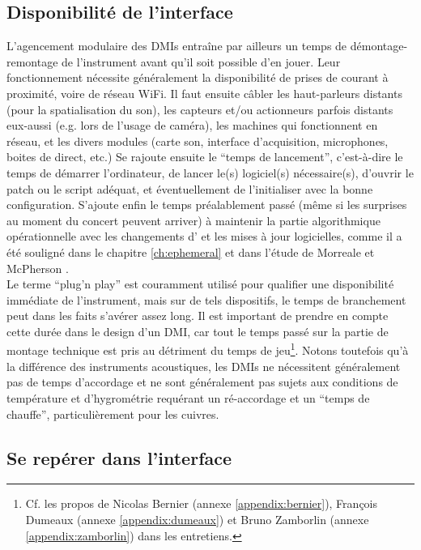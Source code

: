 \subsection{Disponibilité de l'interface}
\label{sec:interfaces:ergonomy:disponibility}

\noindent L'agencement modulaire des \glspl{DMI} entraîne par ailleurs un temps de démontage-remontage de l'instrument avant qu'il soit possible d'en jouer. Leur fonctionnement nécessite généralement la disponibilité de prises de courant à proximité, voire de réseau WiFi. Il faut ensuite câbler les haut-parleurs distants (pour la spatialisation du son), les capteurs et/ou actionneurs parfois distants eux-aussi (e.g. lors de l'usage de caméra), les machines qui fonctionnent en réseau, et les divers modules (carte son, interface d'acquisition, microphones, boites de direct, etc.) Se rajoute ensuite le ``temps de lancement'', c'est-à-dire le temps de démarrer l'ordinateur, de lancer le(s) logiciel(s) nécessaire(s), d'ouvrir le patch ou le script adéquat, et éventuellement de l'initialiser avec la bonne configuration. S'ajoute enfin le temps préalablement passé (même si les surprises au moment du concert peuvent arriver) à maintenir la partie algorithmique opérationnelle avec les changements d' et les mises à jour logicielles, comme il a été souligné dans le chapitre \ref{ch:ephemeral} et dans l'étude de Morreale et McPherson \cite{morreale_design_2017}.\\
\indent Le terme ``plug'n play'' est couramment utilisé pour qualifier une disponibilité immédiate de l'instrument, mais sur de tels dispositifs, le temps de branchement peut dans les faits s'avérer assez long. Il est important de prendre en compte cette durée dans le design d'un \gls{DMI}, car tout le temps passé sur la partie de montage technique est pris au détriment du temps de jeu\footnote{Cf. les propos de Nicolas Bernier (annexe \ref{appendix:bernier}), François Dumeaux (annexe \ref{appendix:dumeaux}) et Bruno Zamborlin (annexe \ref{appendix:zamborlin}) dans les entretiens.}. Notons toutefois qu'à la différence des instruments acoustiques, les \glspl{DMI} ne nécessitent généralement pas de temps d'accordage et ne sont généralement pas sujets aux conditions de température et d'hygrométrie requérant un ré-accordage et un ``temps de chauffe'', particulièrement pour les cuivres.


\subsection{Se repérer dans l'interface}
\label{sec:interfaces:ergonomy:cues}

